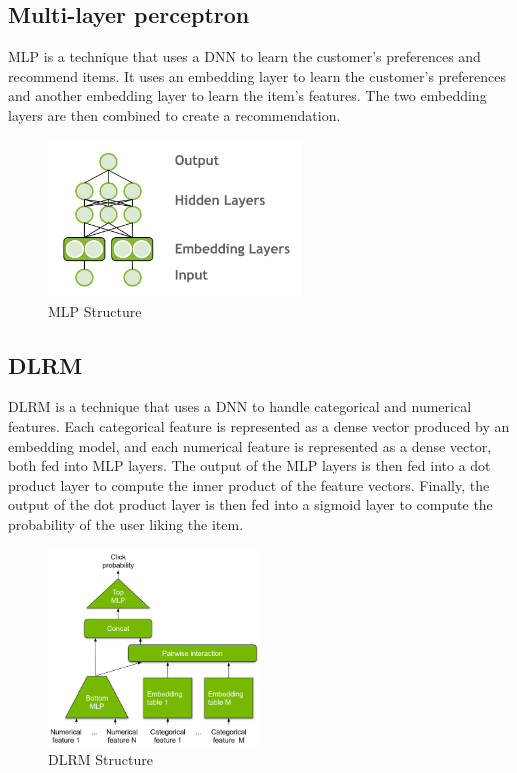 \subsection{Multi-layer perceptron}
MLP is a technique that uses a DNN to learn the customer's preferences and recommend items. It uses an embedding layer to learn the customer's preferences and another embedding layer to learn the item's features. The two embedding layers are then combined to create a recommendation.
\begin{figure}[H]
    \centering
    \includegraphics[width=0.6\textwidth]{assets/mlp.png}
    \caption[MLP Structure]{MLP Structure \cite{ExploringMerlinModels}}
    \label{fig:multi-layer-perceptron}
\end{figure}

\subsection{DLRM}
DLRM is a technique that uses a DNN to handle categorical and numerical features. 
Each categorical feature is represented as a dense vector produced by an embedding model, 
and each numerical feature is represented as a dense vector, both fed into MLP layers. 
The output of the MLP layers is then fed into a dot product layer to compute the inner product of the feature vectors. 
Finally, the output of the dot product layer is then fed into a sigmoid layer to compute the probability of the user liking the item.

\begin{figure}[H]
    \centering
    \includegraphics[width=0.5\textwidth]{assets/dlrm.png}
    \caption[DLRM Structure]{DLRM Structure \cite{NvidiaRecSys}}
    \label{fig:dlrm}
\end{figure}
